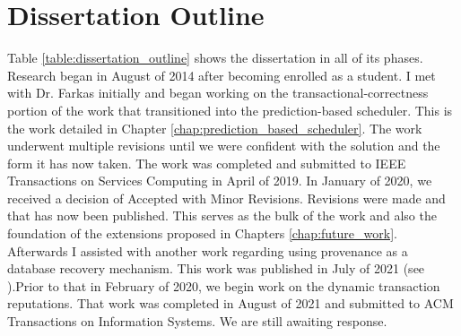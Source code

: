 \section{Dissertation Outline}
\label{diss:dissertation_outline}

\newcommand{\dissPhaseOne}
{\textbf{Transactional Correctness:} Consistency control algorithms prototyped and formally proven as a part of prediction-based solution (\ac{PBS}). \textbf{Published in IEEE Transactions, February 2020}\newline}

\newcommand{\dissPhaseTwo}
{\textbf{Dissertation Proposal}}

\newcommand{\dissPhaseThree}
{\textbf{Dynamic Transaction Reputation:} Analyze and leverage reputation management solutions within \ac{PBS} \textbf{Submitted to ACM Transactions of Information Systems\newline}}

\newcommand{\dissPhaseFour}
{\textbf{Database Recovery using Provenance:} Assisted with publication with other students. \textbf{Published in Data 2021} }

\newcommand{\dissPhaseFive}
{\textbf{Dissertation Defense}}


Table \ref{table:dissertation_outline} shows the dissertation in all of its phases. Research began in August of 2014 after becoming enrolled as a student. I met with Dr. Farkas initially and began working on the transactional-correctness portion of the work that transitioned into the prediction-based scheduler. This is the work detailed in Chapter \ref{chap:prediction_based_scheduler}. The work underwent multiple revisions until we were confident with the solution and the form it has now taken. The work was completed and submitted to IEEE Transactions on Services Computing in April of 2019. In January of 2020, we received a decision of Accepted with Minor Revisions. Revisions were made and that has now been published. This serves as the bulk of the work and also the foundation of the extensions proposed in Chapters \ref{chap:future_work}. Afterwards I assisted with another work regarding using provenance as a database recovery mechanism. This work was published in July of 2021 (see \cite{theppatorn_2021}).Prior to that in February of 2020, we begin work on the dynamic transaction reputations. That work was completed in August of 2021 and submitted to ACM Transactions on Information Systems. We are still awaiting response.

